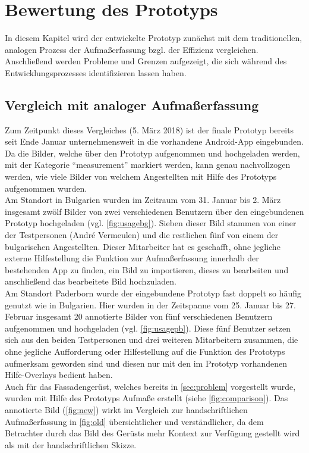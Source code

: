 \chapter{Bewertung des Prototyps}
In diesem Kapitel wird der entwickelte Prototyp zunächst mit dem traditionellen, analogen Prozess der Aufmaßerfassung bzgl. der Effizienz vergleichen.
Anschließend werden Probleme und Grenzen aufgezeigt, die sich während des Entwicklungsprozesses identifizieren lassen haben.

\section{Vergleich mit analoger Aufmaßerfassung}
Zum Zeitpunkt dieses Vergleiches (5. März 2018) ist der finale Prototyp bereits seit Ende Januar unternehmensweit in die vorhandene Android-App eingebunden.
Da die Bilder, welche über den Prototyp aufgenommen und hochgeladen werden, mit der Kategorie ``measurement'' markiert werden, kann genau nachvollzogen werden, wie viele Bilder von welchem Angestellten mit Hilfe des Prototyps aufgenommen wurden. \\

Am Standort in Bulgarien wurden im Zeitraum vom 31. Januar bis 2. März insgesamt zwölf Bilder von zwei verschiedenen Benutzern über den eingebundenen Prototyp hochgeladen (vgl. \autoref{fig:usagebg}).
Sieben dieser Bild stammen von einer der Testpersonen (André Vermeulen) und die restlichen fünf von einem der bulgarischen Angestellten.
Dieser Mitarbeiter hat es geschafft, ohne jegliche externe Hilfestellung die Funktion zur Aufmaßerfassung innerhalb der bestehenden App zu finden, ein Bild zu importieren, dieses zu bearbeiten und anschließend das bearbeitete Bild hochzuladen. \\

Am Standort Paderborn wurde der eingebundene Prototyp fast doppelt so häufig genutzt wie in Bulgarien.
Hier wurden in der Zeitspanne vom 25. Januar bis 27. Februar insgesamt 20 annotierte Bilder von fünf verschiedenen Benutzern aufgenommen und hochgeladen (vgl. \autoref{fig:usagepb}).
Diese fünf Benutzer setzen sich aus den beiden Testpersonen und drei weiteren Mitarbeitern zusammen, die ohne jegliche Aufforderung oder Hilfestellung auf die Funktion des Prototyps aufmerksam geworden sind und diesen nur mit den im Prototyp vorhandenen Hilfe-Overlays bedient haben. \\

Auch für das Fassadengerüst, welches bereits in \autoref{sec:problem} vorgestellt wurde, wurden mit Hilfe des Prototyps Aufmaße erstellt (siehe \autoref{fig:comparison}).
Das annotierte Bild (\autoref{fig:new}) wirkt im Vergleich zur handschriftlichen Aufmaßerfassung in \autoref{fig:old} übersichtlicher und verständlicher, da dem Betrachter durch das Bild des Gerüsts mehr Kontext zur Verfügung gestellt wird als mit der handschriftlichen Skizze. \\

